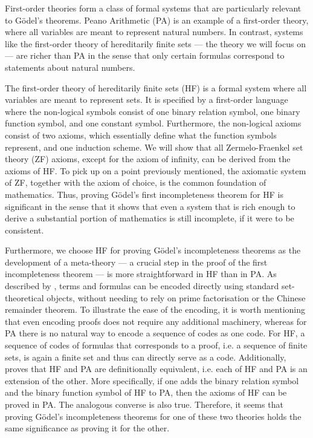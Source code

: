 First-order theories form a class of formal systems that are particularly relevant to 
Gödel's theorems.
Peano Arithmetic (PA) is an example of a first-order theory, 
where all variables are meant to represent natural numbers. 
In contrast, systems like the first-order theory of hereditarily finite sets — 
the theory we will focus on — are richer than PA in the sense that 
only certain formulas correspond to statements about natural numbers. 

The first-order theory of hereditarily finite sets (HF) is a formal system where all variables are 
meant to represent sets. It is specified by a first-order language where the non-logical symbols
consist of one binary relation symbol, one binary function symbol, and one constant symbol.
Furthermore, the non-logical axioms consist of two axioms, which essentially define what the 
function symbols represent, and one induction scheme.
We will show that all Zermelo-Fraenkel set theory (ZF) axioms, except for the axiom of infinity,
can be derived from the axioms of HF.
To pick up on a point previously mentioned, the axiomatic system of ZF, 
together with the axiom of choice, is the common foundation of mathematics.
Thus, proving Gödel's first incompleteness theorem for HF is significant in the sense that
it shows that even a system that is rich enough to derive a substantial portion of mathematics 
is still incomplete, if it were to be consistent.

Furthermore, we choose HF for proving Gödel's incompleteness theorems as 
the development of a meta-theory — a crucial step in the proof of the 
first incompleteness theorem — is more straightforward in HF than in PA.
As described by \cite{swierczkowski2003finite}, terms and formulas can be encoded directly 
using standard set-theoretical objects, without needing to rely on prime factorisation or 
the Chinese remainder theorem.
To illustrate the ease of the encoding, it is worth mentioning that 
even encoding proofs does not require any additional machinery, whereas for PA there is no natural
way to encode a sequence of codes as one code.
For HF, a sequence of codes of formulas that corresponds to a proof, 
i.e. a sequence of finite sets, is again a finite set and thus can directly serve as a code.
Additionally, \cite{swierczkowski2003finite} proves that HF and PA are definitionally equivalent,
i.e. each of HF and PA is an extension of the other. More specifically,
if one adds the binary relation symbol and the binary function symbol of HF to PA, 
then the axioms of HF can be proved in PA. The analogous converse is also true.
Therefore, it seems that proving Gödel's incompleteness theorems for one of these two theories 
holds the same significance as proving it for the other.

